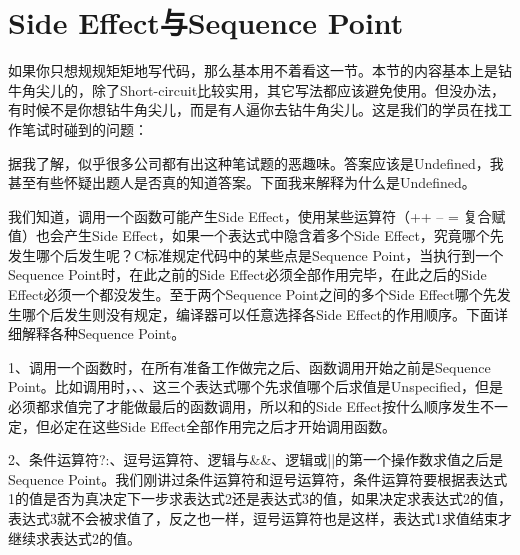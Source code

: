 


\section{Side Effect与Sequence Point}
%
如果你只想规规矩矩地写代码，那么基本用不着看这一节。本节的内容基本上是钻牛角尖儿的，除了Short-circuit比较实用，其它写法都应该避免使用。但没办法，有时候不是你想钻牛角尖儿，而是有人逼你去钻牛角尖儿。这是我们的学员在找工作笔试时碰到的问题：




据我了解，似乎很多公司都有出这种笔试题的恶趣味。答案应该是Undefined，我甚至有些怀疑出题人是否真的知道答案。下面我来解释为什么是Undefined。



我们知道，调用一个函数可能产生Side Effect，使用某些运算符（++ -- = 复合赋值）也会产生Side Effect，如果一个表达式中隐含着多个Side Effect，究竟哪个先发生哪个后发生呢？C标准规定代码中的某些点是Sequence Point，当执行到一个Sequence Point时，在此之前的Side Effect必须全部作用完毕，在此之后的Side Effect必须一个都没发生。至于两个Sequence Point之间的多个Side Effect哪个先发生哪个后发生则没有规定，编译器可以任意选择各Side Effect的作用顺序。下面详细解释各种Sequence Point。



1、调用一个函数时，在所有准备工作做完之后、函数调用开始之前是Sequence Point。比如调用时，、、这三个表达式哪个先求值哪个后求值是Unspecified，但是必须都求值完了才能做最后的函数调用，所以和的Side Effect按什么顺序发生不一定，但必定在这些Side Effect全部作用完之后才开始调用函数。



2、条件运算符?:、逗号运算符、逻辑与\&\&、逻辑或||的第一个操作数求值之后是Sequence Point。我们刚讲过条件运算符和逗号运算符，条件运算符要根据表达式1的值是否为真决定下一步求表达式2还是表达式3的值，如果决定求表达式2的值，表达式3就不会被求值了，反之也一样，逗号运算符也是这样，表达式1求值结束才继续求表达式2的值。



